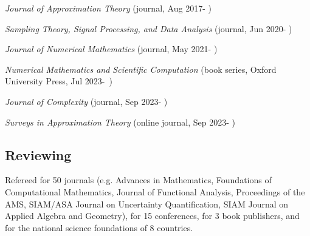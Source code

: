 \documentclass[11pt]{article}
\begin{document}
\bitemize
\item
{\sl Journal of Approximation Theory} (journal, Aug 2017- )
\item
{\sl Sampling Theory, Signal Processing, and Data Analysis} (journal, Jun 2020- )
\item
{\sl Journal of Numerical Mathematics} (journal, May 2021- )
\item 
{\em Numerical Mathematics and Scientific Computation} (book series, Oxford University Press, Jul 2023-~)
\item
{\sl Journal of Complexity} (journal, Sep 2023- )
\item 
{\sl Surveys in Approximation Theory} (online journal, Sep 2023- )
\eitemize

%
 
\subsection{Reviewing}

Refereed for 50 journals 
(e.g. Advances in Mathematics, 
Foundations of Computational Mathematics, 
Journal of Functional Analysis, 
Proceedings of the AMS,
SIAM/ASA Journal on Uncertainty Quantification,
SIAM Journal on Applied Algebra and Geometry),
for 15 conferences, 
for 3 book publishers,
and for the national science foundations of 8 countries.
\end{document}
